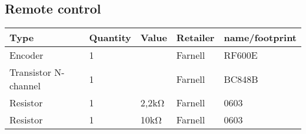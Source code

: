 \subsection{Remote control}
\begin{center}
\begin{tabularx}{\textwidth}{|X|l|l|l|l|}
    \hline
   \textbf{Type} & \textbf{Quantity} & \textbf{Value} & \textbf{Retailer} & \textbf{name/footprint} \\ \hline
    Encoder & 1 &  & Farnell & RF600E \\ \hline
    Transistor N-channel & 1 &  & Farnell & BC848B \\ \hline
    Resistor & 1 & 2,2kΩ & Farnell & 0603 \\ \hline
    Resistor & 1 & 10kΩ & Farnell & 0603 \\ \hline
	\end{tabularx}
\end{center}